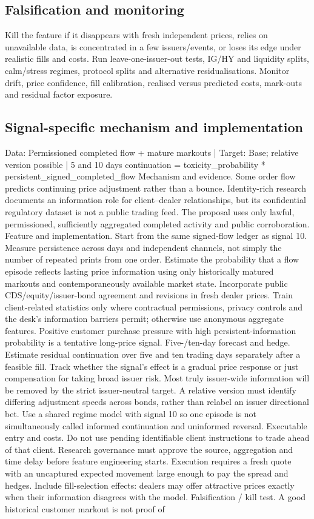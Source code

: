 \documentclass[10pt]{article}
\begin{document}
\subsection{Falsification and monitoring}
Kill the feature if it disappears with fresh independent prices, relies on unavailable data, is concentrated in a few issuers/events, or loses its edge under realistic fills and costs. Run leave-one-issuer-out tests, IG/HY and liquidity splits, calm/stress regimes, protocol splits and alternative residualisations. Monitor drift, price confidence, fill calibration, realised versus predicted costs, mark-outs and residual factor exposure.
\subsection{Signal-specific mechanism and implementation}
Data: Permissioned completed flow + mature markouts  |  Target: Base; relative version possible  |  5 and 10 days continuation = toxicity\_probability * persistent\_signed\_completed\_flow Mechanism and evidence.  Some order flow predicts continuing price adjustment rather than a bounce. Identity-rich research documents an information role for client--dealer relationships, but its confidential regulatory dataset is not a public trading feed. The proposal uses only lawful, permissioned, sufficiently aggregated completed activity and public corroboration. Feature and implementation.  Start from the same signed-flow ledger as signal 10. Measure persistence across days and independent channels, not simply the number of repeated prints from one order. Estimate the probability that a flow episode reflects lasting price information using only historically matured markouts and contemporaneously available market state. Incorporate public CDS/equity/issuer-bond agreement and revisions in fresh dealer prices. Train client-related statistics only where contractual permissions, privacy controls and the desk’s information barriers permit; otherwise use anonymous aggregate features. Positive customer purchase pressure with high persistent-information probability is a tentative long-price signal. Five-/ten-day forecast and hedge.  Estimate residual continuation over five and ten trading days separately after a feasible fill. Track whether the signal’s effect is a gradual price response or just compensation for taking broad issuer risk. Most truly issuer-wide information will be removed by the strict issuer-neutral target. A relative version must identify differing adjustment speeds across bonds, rather than relabel an issuer directional bet. Use a shared regime model with signal 10 so one episode is not simultaneously called informed continuation and uninformed reversal. Executable entry and costs.  Do not use pending identifiable client instructions to trade ahead of that client. Research governance must approve the source, aggregation and time delay before feature engineering starts. Execution requires a fresh quote with an uncaptured expected movement large enough to pay the spread and hedges. Include fill-selection effects: dealers may offer attractive prices exactly when their information disagrees with the model. Falsification / kill test.  A good historical customer markout is not proof of 
\end{document}
